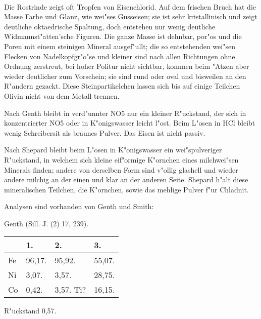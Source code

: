 \documentclass[a4paper, 11pt, oneside]{article}
\begin{document}
\paragraph{}
Die Rostrinde zeigt oft Tropfen von Eisenchlorid. Auf dem frischen Bruch hat die Masse Farbe und Glanz, wie wei"ses Gusseisen; sie ist sehr kristallinisch und zeigt deutliche oktaedrische Spaltung, doch entstehen nur wenig deutliche Widmannst"atten'sche Figuren. Die ganze Masse ist dehnbar, por"os und die Poren mit einem steinigen Mineral ausgef"ullt; die so entstehenden wei"sen Flecken von Nadelkopfgr"o"se und kleiner sind nach allen Richtungen ohne Ordnung zerstreut, bei hoher Politur nicht sichtbar, kommen beim "Atzen aber wieder deutlicher zum Vorschein; sie sind rund oder oval und bisweilen an den R"andern gezackt. Diese Steinpartikelchen lassen sich bis auf einige Teilchen Olivin nicht von dem Metall trennen.

Nach Genth bleibt in verd"unnter NO5 nur ein kleiner R"uckstand, der sich in konzentrierter NO5 oder in K"onigswasser leicht l"ost. Beim L"osen in HCl bleibt wenig Schreibersit als braunes Pulver. Das Eisen ist nicht passiv.

Nach Shepard bleibt beim L"osen in K"onigswasser ein wei"spulveriger R"uckstand, in welchem sich kleine eif"ormige K"ornchen eines milchwei"sen Minerals finden; andere von derselben Form sind v"ollig glashell und wieder andere milchig an der einen und klar an der anderen Seite. Shepard h"alt diese mineralischen Teilchen, die K"ornchen, sowie das mehlige Pulver f"ur Chladnit.

Analysen sind vorhanden von Genth und Smith:

Genth (Sill. J. (2) 17, 239).  
\begin{table}[H]
    \centering
    \begin{tabular}{l l l l}
         & 1. & 2. & 3. \\ \hline
        Fe & 96,17. & 95,92. & 55,07. \\
        Ni & 3,07. & 3,57. & 28,75. \\
        Co & 0,42. & 3,57. Ti? & 16,15. \\
    \end{tabular}
\end{table}
R"uckstand 0,57.
\end{document}
